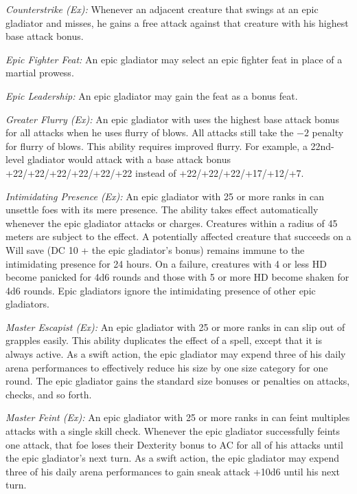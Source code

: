 \textit{Counterstrike (Ex):} Whenever an adjacent creature that swings at an epic gladiator and misses, he gains a free attack against that creature with his highest base attack bonus.

\textit{Epic Fighter Feat:} An epic gladiator may select an epic fighter feat in place of a martial prowess.

\textit{Epic Leadership:} An epic gladiator may gain the  feat as a bonus feat.


\textit{Greater Flurry (Ex):} An epic gladiator with uses the highest base attack bonus for all attacks when he uses flurry of blows. All attacks still take the $-2$ penalty for flurry of blows. This ability requires improved flurry. For example, a 22nd-level gladiator would attack with a base attack bonus +22/+22/+22/+22/+22/+22 instead of +22/+22/+22/+17/+12/+7.

\textit{Intimidating Presence (Ex):} An epic gladiator with 25 or more ranks in  can unsettle foes with its mere presence. The ability takes effect automatically whenever the epic gladiator attacks or charges. Creatures within a radius of 45 meters are subject to the effect. A potentially affected creature that succeeds on a Will save (DC 10 + the epic gladiator's  bonus) remains immune to the intimidating presence for 24 hours. On a failure, creatures with 4 or less HD become panicked for 4d6 rounds and those with 5 or more HD become shaken for 4d6 rounds. Epic gladiators ignore the intimidating presence of other epic gladiators.

\textit{Master Escapist (Ex):} An epic gladiator with 25 or more ranks in  can slip out of grapples easily. This ability duplicates the effect of a  spell, except that it is always active. As a swift action, the epic gladiator may expend three of his daily arena performances to effectively reduce his size by one size category for one round. The epic gladiator gains the standard size bonuses or penalties on attacks,  checks, and so forth.

\textit{Master Feint (Ex):} An epic gladiator with 25 or more ranks in  can feint multiples attacks with a single skill check. Whenever the epic gladiator successfully feints one attack, that foe loses their Dexterity bonus to AC for all of his attacks until the epic gladiator's next turn. As a swift action, the epic gladiator may expend three of his daily arena performances to gain sneak attack +10d6 until his next turn.

